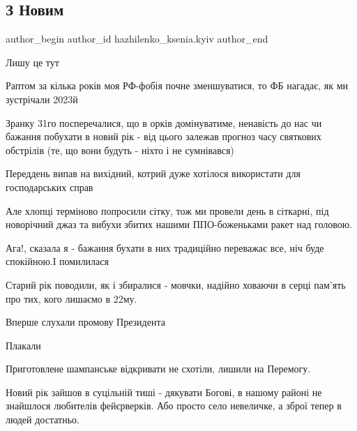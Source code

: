  
 
 
 
 

\subsection{З Новим}
\label{sec:01_01_2023.fb.hazhilenko_ksenia.kyiv.1.z_novim}

\ifcmt
 author_begin
   author_id hazhilenko_ksenia.kyiv
 author_end
\fi

Лишу це тут

Раптом за кілька років моя РФ-фобія почне зменшуватися, то ФБ нагадає, як ми
зустрічали 2023й

Зранку 31го посперечалися, що в орків домінуватиме, ненавість до нас чи бажання
побухати в новий рік - від цього залежав прогноз часу  святкових обстрілів (те,
що вони будуть - ніхто і не сумнівався)

Переддень випав на вихідний, котрий дуже хотілося використати для господарських
справ 

Але хлопці терміново попросили сітку, тож ми провели день в сіткарні, під
новорічний джаз та вибухи збитих нашими ППО-боженьками ракет над головою.

Ага!, сказала я - бажання бухати в них традиційно переважає все, ніч буде
спокійною.І помилилася

Старий рік поводили, як і збиралися - мовчки,  надійно ховаючи в серці пам’ять
про тих, кого лишаємо в 22му.

Вперше слухали промову Президента

Плакали

Приготовлене шампанське відкривати не схотіли, лишили на Перемогу.

Новий рік зайшов в суцільній тиші - дякувати Богові, в нашому районі не
знайшлося любителів фейєрверків. Або просто село невеличке, а зброї тепер в
людей достатньо.

